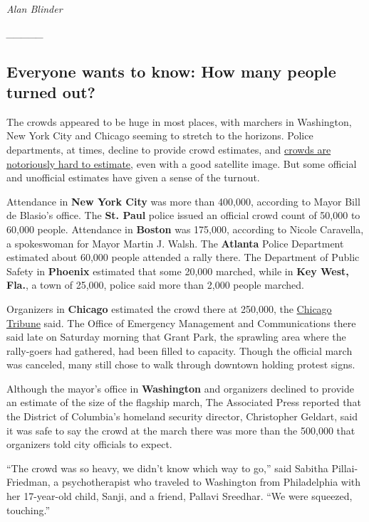 \emph{Alan Blinder}

\emph{\_\_\_\_\_}

\hypertarget{everyone-wants-to-know-how-many-people-turned-out}{%
\subsection{Everyone wants to know: How many people turned
out?}\label{everyone-wants-to-know-how-many-people-turned-out}}

The crowds appeared to be huge in most places, with marchers in
Washington, New York City and Chicago seeming to stretch to the
horizons. Police departments, at times, decline to provide crowd
estimates, and
\href{https://www.nytimes.com/interactive/2017/01/18/us/politics/How-Crowds-at-the-Capitol-Have-Been-Counted.html}{crowds
are notoriously hard to estimate}, even with a good satellite image. But
some official and unofficial estimates have given a sense of the
turnout.

Attendance in \textbf{New York City} was more than 400,000, according to
Mayor Bill de Blasio's office. The \textbf{St. Paul} police issued an
official crowd count of 50,000 to 60,000 people. Attendance in
\textbf{Boston} was 175,000, according to Nicole Caravella, a
spokeswoman for Mayor Martin J. Walsh. The \textbf{Atlanta} Police
Department estimated about 60,000 people attended a rally there. The
Department of Public Safety in \textbf{Phoenix} estimated that some
20,000 marched, while in \textbf{Key West, Fla.}, a town of 25,000,
police said more than 2,000 people marched.

Organizers in \textbf{Chicago} estimated the crowd there at 250,000, the
\href{http://www.chicagotribune.com/news/ct-womens-march-chicago-0122-20170121-story.html}{Chicago
Tribune} said. The Office of Emergency Management and Communications
there said late on Saturday morning that Grant Park, the sprawling area
where the rally-goers had gathered, had been filled to capacity. Though
the official march was canceled, many still chose to walk through
downtown holding protest signs.

Although the mayor's office in \textbf{Washington} and organizers
declined to provide an estimate of the size of the flagship march, The
Associated Press reported that the District of Columbia's homeland
security director, Christopher Geldart, said it was safe to say the
crowd at the march there was more than the 500,000 that organizers told
city officials to expect.

``The crowd was so heavy, we didn't know which way to go,'' said Sabitha
Pillai-Friedman, a psychotherapist who traveled to Washington from
Philadelphia with her 17-year-old child, Sanji, and a friend, Pallavi
Sreedhar. ``We were squeezed, touching.''

